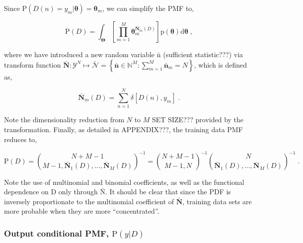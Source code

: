 \documentclass[12pt]{article}
\begin{document}
Since $\text{P}(D(n) = y_m | \bm{\theta}) = \bm{\theta}_m$, we can simplify the PMF to,

\begin{equation} \label{P_D_int2}
\text{P}(D) = \int_{\bm{\Theta}} \left[ \prod_{m=1}^M \bm{\theta}_m^{\bar{\bm{N}}_m(D)} \right] \text{p}(\bm{\theta}) \mathrm{d}\bm{\theta} \;,
\end{equation}

where we have introduced a new random variable $\bar{\bm{\mathrm{n}}}$ (sufficient statistic???) via transform function $\bar{\bm{N}}: \mathcal{Y}^N \mapsto \bar{\mathcal{N}} = \left\{ \bar{\bm{n}} \in \mathbb{N}^M: \sum_{m=1}^M \bar{\bm{n}}_m = N \right\}$, which is defined as,


\begin{equation}
\bar{\bm{N}}_m(D) = \sum_{n=1}^N \delta[D(n),y_m] \;.
\end{equation}

Note the dimensionality reduction from $N$ to $M$ SET SIZE??? provided by the transformation. Finally, as detailed in APPENDIX???, the training data PMF reduces to,

\begin{equation} \label{P_D}
\text{P}(D) = \binom{N+M-1}{M-1,\bar{\bm{N}}_1(D),\ldots,\bar{\bm{N}}_M(D)}^{-1} 
= \binom{N+M-1}{M-1,N}^{-1} \binom{N}{\bar{\bm{N}}_1(D),\ldots,\bar{\bm{N}}_M(D)}^{-1} \;.
\end{equation}

Note the use of multinomial and binomial coefficients, as well as the functional dependence on $\mathrm{D}$ only through $\bar{\bm{\mathrm{N}}}$. It should be clear that since the PDF is inversely proportionate to the multinomial coefficient of $\bar{\bm{N}}$, training data sets are more probable when they are more ``concentrated''. 





\subsubsection{Output conditional PMF, $\text{P}(y | D)$}
\end{document}
